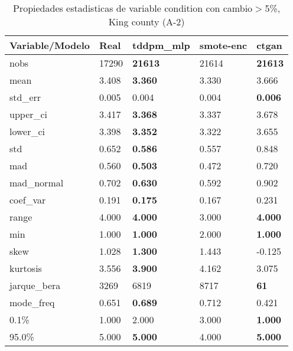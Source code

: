 \begin{table}[H]
\centering
\fontsize{8}{14}\selectfont
\caption{Propiedades estadisticas de variable condition con cambio\ensuremath{>}5\%, King county (A-2)}
\label{table-stats-king county-a-2-condition-short}
\begin{tabular}{|l|m{10em}|m{10em}|m{10em}|m{10em}|}
\hline
 \rowcolor[gray]{0.8}
Variable/Modelo & Real & tddpm\_mlp & smote-enc & ctgan \\
\hline nobs & 17290 & \bfseries 21613 & \cellcolor[rgb]{0.9, 0.54, 0.52} 21614 & \bfseries 21613 \\
\hline mean & 3.408 & \bfseries 3.360 & 3.330 & \cellcolor[rgb]{0.9, 0.54, 0.52} 3.666 \\
\hline std\_err & 0.005 & 0.004 & \cellcolor[rgb]{0.9, 0.54, 0.52} 0.004 & \bfseries 0.006 \\
\hline upper\_ci & 3.417 & \bfseries 3.368 & 3.337 & \cellcolor[rgb]{0.9, 0.54, 0.52} 3.678 \\
\hline lower\_ci & 3.398 & \bfseries 3.352 & 3.322 & \cellcolor[rgb]{0.9, 0.54, 0.52} 3.655 \\
\hline std & 0.652 & \bfseries 0.586 & 0.557 & \cellcolor[rgb]{0.9, 0.54, 0.52} 0.848 \\
\hline mad & 0.560 & \bfseries 0.503 & 0.472 & \cellcolor[rgb]{0.9, 0.54, 0.52} 0.720 \\
\hline mad\_normal & 0.702 & \bfseries 0.630 & 0.592 & \cellcolor[rgb]{0.9, 0.54, 0.52} 0.902 \\
\hline coef\_var & 0.191 & \bfseries 0.175 & 0.167 & \cellcolor[rgb]{0.9, 0.54, 0.52} 0.231 \\
\hline range & 4.000 & \bfseries 4.000 & \cellcolor[rgb]{0.9, 0.54, 0.52} 3.000 & \bfseries 4.000 \\
\hline min & 1.000 & \bfseries 1.000 & \cellcolor[rgb]{0.9, 0.54, 0.52} 2.000 & \bfseries 1.000 \\
\hline skew & 1.028 & \bfseries 1.300 & 1.443 & \cellcolor[rgb]{0.9, 0.54, 0.52} -0.125 \\
\hline kurtosis & 3.556 & \bfseries 3.900 & \cellcolor[rgb]{0.9, 0.54, 0.52} 4.162 & 3.075 \\
\hline jarque\_bera & 3269 & 6819 & \cellcolor[rgb]{0.9, 0.54, 0.52} 8717 & \bfseries 61 \\
\hline mode\_freq & 0.651 & \bfseries 0.689 & 0.712 & \cellcolor[rgb]{0.9, 0.54, 0.52} 0.421 \\
\hline 0.1\% & 1.000 & 2.000 & \cellcolor[rgb]{0.9, 0.54, 0.52} 3.000 & \bfseries 1.000 \\
\hline 95.0\% & 5.000 & \bfseries 5.000 & \cellcolor[rgb]{0.9, 0.54, 0.52} 4.000 & \bfseries 5.000 \\
\hline
\end{tabular}
\end{table}
